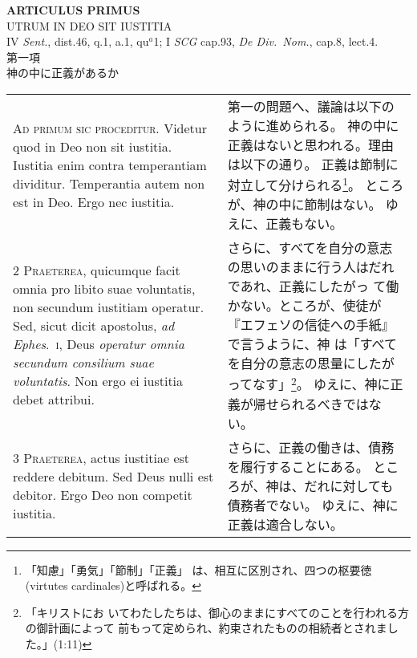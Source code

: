 \documentclass[10pt]{jsarticle} %
\begin{document}
{
\begin{center}
 {\Large {\bf ARTICULUS PRIMUS}}\\
 {\large UTRUM IN DEO SIT IUSTITIA}\\
 {\footnotesize IV {\itshape Sent.}, dist.46, q.1, a.1, qu$^a$1; I
 {\itshape SCG} cap.93, {\itshape De Div.~Nom.}, cap.8, lect.4.}\\
 {\Large 第一項\\神の中に正義があるか}
\end{center}

\begin{longtable}{p{21em}p{21em}}

{\Huge A}{\scshape d primum sic proceditur}. Videtur quod in
Deo non sit iustitia. Iustitia enim contra temperantiam
dividitur. Temperantia autem non est in Deo. Ergo nec iustitia.

&

第一の問題へ、議論は以下のように進められる。
神の中に正義はないと思われる。理由は以下の通り。
正義は節制に対立して分けられる\footnote{「知慮」「勇気」「節制」「正義」
 は、相互に区別され、四つの枢要徳(virtutes cardinales)と呼ばれる。}。
ところが、神の中に節制はない。
ゆえに、正義もない。


\\


{\scshape 2 Praeterea}, quicumque facit omnia pro libito
suae voluntatis, non secundum iustitiam operatur. Sed, sicut dicit
apostolus, {\itshape ad Ephes}.~{\scshape i}, Deus {\itshape operatur omnia secundum consilium suae
voluntatis}. Non ergo ei iustitia debet attribui.

&

さらに、すべてを自分の意志の思いのままに行う人はだれであれ、正義にしたがっ
 て働かない。ところが、使徒が『エフェソの信徒への手紙』で言うように、神
 は「すべてを自分の意志の思量にしたがってなす」\footnote{「キリストにお
 いてわたしたちは、御心のままにすべてのことを行われる方の御計画によって
 前もって定められ、約束されたものの相続者とされました。」(1:11)}。
ゆえに、神に正義が帰せられるべきではない。


\\


{\scshape 3 Praeterea}, actus iustitiae est reddere
debitum. Sed Deus nulli est debitor. Ergo Deo non competit iustitia.

&

さらに、正義の働きは、債務を履行することにある。
ところが、神は、だれに対しても債務者でない。
ゆえに、神に正義は適合しない。



\end{longtable}}
\end{document}
